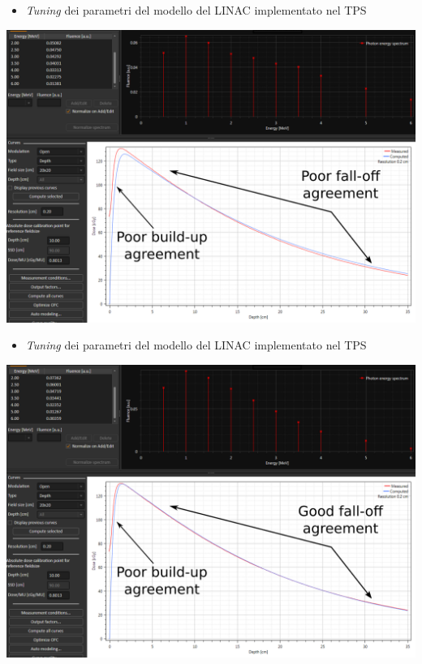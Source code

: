 \documentclass{beamer}
\begin{document}
\begin{frame}{}
\thispagestyle{empty}
\begin{itemize}
\scriptsize
{}
\item \alert{\textit{Tuning} dei parametri del modello del LINAC implementato nel TPS}
\end{itemize}
\centering
\includegraphics[width=1.2\textwidth]{./img/pddmodel1.PNG}
\end{frame}

\begin{frame}{}
\thispagestyle{empty}
\begin{itemize}
\scriptsize
{}
\item \alert{\textit{Tuning} dei parametri del modello del LINAC implementato nel TPS}
\end{itemize}
\centering
\includegraphics[width=1.2\textwidth]{./img/pddmodel2.PNG}
\end{frame}
\end{document}
